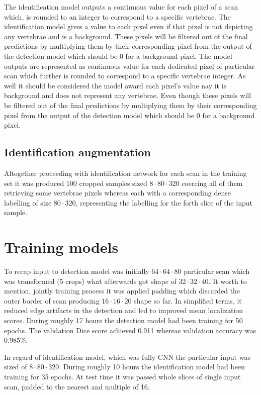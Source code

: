 The identification model outputs a continuous value for each pixel of a scan which, is rounded to an integer to correspond to a specific vertebrae. The identification model gives a value to each pixel even if that pixel is not depicting any vertebrae and is a background. These pixels will be filtered out of the final predictions by multiplying them by their corresponding pixel from the output of the detection model which should be 0 for a background pixel. The model outputs are represented as continuous value for each dedicated pixel of particular scan which further is rounded to correspond to a specific vertebrae integer. As well it should be considered the model award each pixel's value nay it is background and does not represent any vertebrae. Even though these pixels will be filtered out of the final predictions by multiplying them by their corresponding pixel from the output of the detection model which should be 0 for a background pixel.

\subsection{Identification augmentation}
Altogether proceeding with identification network for each scan in the training set it was produced 100 cropped samples sized $8 \cdot 80 \cdot 320$ coercing all of them retrieving some vertebrae pixels whereas each with a corresponding dense labelling of size $80 \cdot 320$, representing the labelling for the forth slice of the input sample.

\section{Training models}
To recap input to detection model was initially $64 \cdot 64 \cdot 80$ particular scan which was transformed (5 crops) what afterwards got shape of $32 \cdot 32 \cdot 40$. It worth to mention, jointly training process it was applied padding which discarded the outer border of scan producing $16 \cdot 16 \cdot 20$ shape so far. In simplified terms, it reduced edge artifacts in the detection and led to improved mean localization scores. During roughly 17 hours the detection model had been training for 50 epochs. The validation Dice score achieved 0.911 whereas validation accuracy was 0.985\%. 

In regard of identification model, which was fully CNN the particular input was sized of $8 \cdot 80 \cdot 320$. During roughly 10 hours the identification model had been training for 35 epochs. At test time it was passed whole slices of single input scan, padded to the nearest and multiple of 16.

